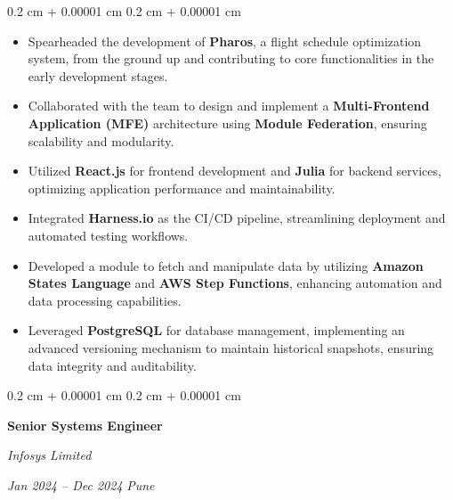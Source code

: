 \documentclass[10pt, letterpaper]{article}
\newenvironment{highlights}{
    \begin{itemize}[
        topsep=0.10 cm,
        parsep=0.10 cm,
        partopsep=0pt,
        itemsep=0pt,
        leftmargin=0.4 cm + 10pt
    ]
}{
    \end{itemize}
}
\newenvironment{onecolentry}{
    \begin{adjustwidth}{
        0.2 cm + 0.00001 cm
    }{
        0.2 cm + 0.00001 cm
    }
}{
    \end{adjustwidth}
}
\newenvironment{twocolentry}[2][]{
    \onecolentry
    \def\secondColumn{#2}
    \setcolumnwidth{\fill, 4.5 cm}
    \begin{paracol}{2}
}{
    \switchcolumn \raggedleft \secondColumn
    \end{paracol}
    \endonecolentry
}
\begin{document}
    \vspace{0.10 cm}
    \begin{onecolentry}
         \begin{highlights}
            \item Spearheaded the development of \textbf{Pharos}, a flight schedule optimization system, from the ground up and contributing to core functionalities in the early development stages.
            \item Collaborated with the team to design and implement a \textbf{Multi-Frontend Application (MFE)} architecture using \textbf{Module Federation}, ensuring scalability and modularity.
            \item Utilized \textbf{React.js} for frontend development and \textbf{Julia} for backend services, optimizing application performance and maintainability.
            \item Integrated \textbf{Harness.io} as the CI/CD pipeline, streamlining deployment and automated testing workflows.
            \item Developed a module to fetch and manipulate data by utilizing \textbf{Amazon States Language} and \textbf{AWS Step Functions}, enhancing automation and data processing capabilities.
            \item Leveraged \textbf{PostgreSQL} for database management, implementing an advanced versioning mechanism to maintain historical snapshots, ensuring data integrity and auditability.
        \end{highlights}
    \end{onecolentry}

    \vspace{0.2 cm}
        \begin{twocolentry}{
        \textit{Jan 2024 – Dec 2024}
        \textit{Pune}    
        }
            \textbf{Senior Systems Engineer}
            
            \textit{Infosys Limited}
        \end{twocolentry}
\end{document}
